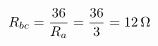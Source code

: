 \documentclass[preview]{standalone}
\begin{document}
\begin{align*}
\special{dvisvgm:raw <g id='unique000'>}R_{bc} = \frac{36}{R_a} = \frac{36}{3} = 12\,\Omega\special{dvisvgm:raw </g>}
\end{align*}
\end{document}
